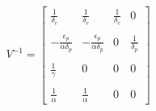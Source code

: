 \documentclass[preview]{standalone}
\begin{document}
\begin{align*}
V^{-1} = \begin{bmatrix} \frac{1}{\delta_c} & \frac{1}{\delta_c} & \frac{1}{\delta_c} & 0 \\ \\ -\frac{\epsilon_p}{\alpha \delta_p} & -\frac{\epsilon_p}{\alpha \delta_p} & 0 & \frac{1}{\delta_p} \\ \\ \frac{1}{\gamma} & 0 & 0 & 0 \\ \\ \frac{1}{\alpha} & \frac{1}{\alpha} & 0 & 0 \end{bmatrix}
\end{align*}
\end{document}
